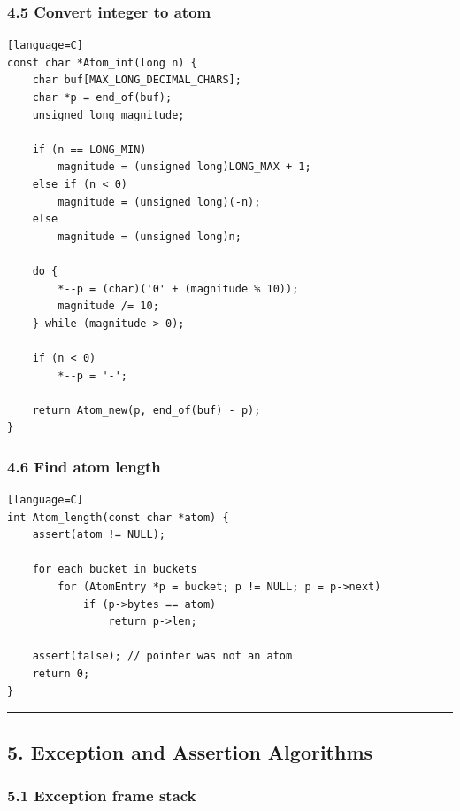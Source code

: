 \documentclass[11pt]{article}
\begin{document}
\subsubsection{4.5 Convert integer to atom}\label{convert-integer-to-atom}

\begin{verbatim}[language=C]
const char *Atom_int(long n) {
    char buf[MAX_LONG_DECIMAL_CHARS];
    char *p = end_of(buf);
    unsigned long magnitude;

    if (n == LONG_MIN)
        magnitude = (unsigned long)LONG_MAX + 1;
    else if (n < 0)
        magnitude = (unsigned long)(-n);
    else
        magnitude = (unsigned long)n;

    do {
        *--p = (char)('0' + (magnitude % 10));
        magnitude /= 10;
    } while (magnitude > 0);

    if (n < 0)
        *--p = '-';

    return Atom_new(p, end_of(buf) - p);
}
\end{verbatim}

\subsubsection{4.6 Find atom length}\label{find-atom-length}

\begin{verbatim}[language=C]
int Atom_length(const char *atom) {
    assert(atom != NULL);

    for each bucket in buckets
        for (AtomEntry *p = bucket; p != NULL; p = p->next)
            if (p->bytes == atom)
                return p->len;

    assert(false); // pointer was not an atom
    return 0;
}
\end{verbatim}

\begin{center}\rule{0.5\linewidth}{0.5pt}\end{center}

\subsection{5. Exception and Assertion Algorithms}\label{exception-and-assertion-algorithms}

\subsubsection{5.1 Exception frame stack}\label{exception-frame-stack}
\end{document}
